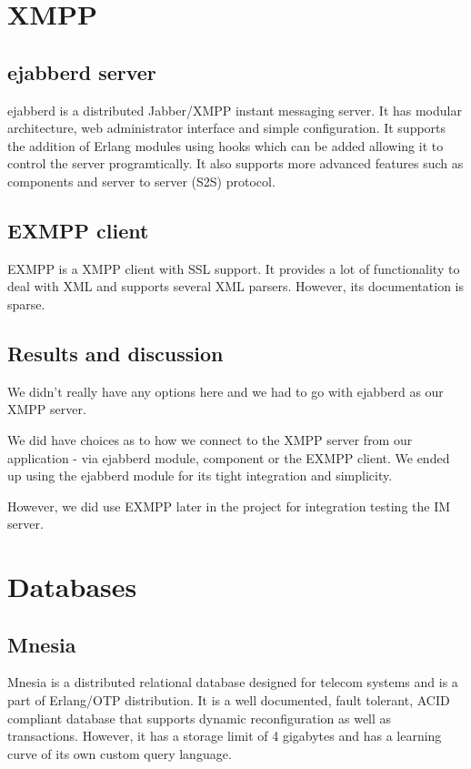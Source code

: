 \documentclass[11pt,a4paper]{report}
\begin{document}
\section{XMPP}
\subsection{ejabberd server}
ejabberd is a distributed Jabber/XMPP instant messaging server. It has modular architecture, web administrator interface and simple configuration. It supports the addition of Erlang modules using hooks which can be added allowing it to control the server programtically. It also supports more advanced features such as components and server to server (S2S) protocol.

\subsection{EXMPP client}
EXMPP is a XMPP client with SSL support. It provides a lot of functionality to deal with XML and supports several XML parsers. However, its documentation is sparse.

\subsection{Results and discussion}
We didn't really have any options here and we had to go with ejabberd as our XMPP server.

We did have choices as to how we connect to the XMPP server from our application - via ejabberd module, component or the EXMPP client. We ended up using the ejabberd module for its tight integration and simplicity.

However, we did use EXMPP later in the project for integration testing the IM server.

\section{Databases}
\subsection{Mnesia}
Mnesia is a distributed relational database designed for telecom systems and is a part of Erlang/OTP distribution. It is a well documented, fault tolerant, ACID\cite{ACID} compliant database that supports dynamic reconfiguration as well as transactions. However, it has a storage limit of 4 gigabytes and has a learning curve of its own custom query language.
\end{document}
